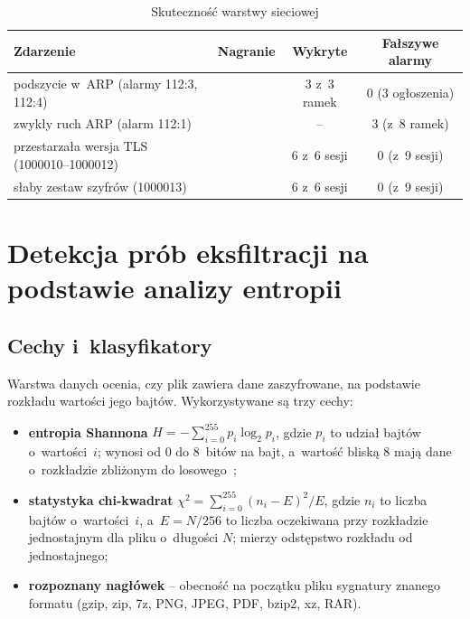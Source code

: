 \begin{table}[htbp]
\centering\small
\begin{tabularx}{\textwidth}{@{}L l c c@{}}
\toprule
\textbf{Zdarzenie} & \textbf{Nagranie} & \textbf{Wykryte} & \textbf{Fałszywe alarmy} \\
\midrule
podszycie w~ARP (alarmy 112:3, 112:4) &  & 3 z~3 ramek & 0 (3 ogłoszenia) \\
zwykły ruch ARP (alarm 112:1) &  & -- & 3 (z~8 ramek) \\
przestarzała wersja TLS (1000010--1000012) &  & 6 z~6 sesji & 0 (z~9 sesji) \\
słaby zestaw szyfrów (1000013) &  & 6 z~6 sesji & 0 (z~9 sesji) \\
\bottomrule
\end{tabularx}
\caption{Skuteczność warstwy sieciowej}
\label{tab:ids-bilans}
\end{table}

\section{Detekcja prób eksfiltracji na podstawie analizy entropii}\label{sec:entropia}

\subsection*{Cechy i~klasyfikatory}

Warstwa danych ocenia, czy plik zawiera dane zaszyfrowane, na podstawie rozkładu wartości jego bajtów. Wykorzystywane są trzy cechy:
\begin{itemize}
  \item \textbf{entropia Shannona} $H = -\sum_{i=0}^{255} p_i \log_2 p_i$, gdzie $p_i$ to udział bajtów o~wartości~$i$; wynosi od 0 do 8~bitów na bajt, a~wartość bliską 8 mają dane o~rozkładzie zbliżonym do losowego~\cite{davies2022};
  \item \textbf{statystyka chi-kwadrat} $\chi^2 = \sum_{i=0}^{255} (n_i - E)^2 / E$, gdzie $n_i$ to liczba bajtów o~wartości~$i$, a~$E = N/256$ to liczba oczekiwana przy rozkładzie jednostajnym dla pliku o~długości $N$; mierzy odstępstwo rozkładu od jednostajnego;
  \item \textbf{rozpoznany nagłówek} -- obecność na początku pliku sygnatury znanego formatu (gzip, zip, 7z, PNG, JPEG, PDF, bzip2, xz, RAR).
\end{itemize}

